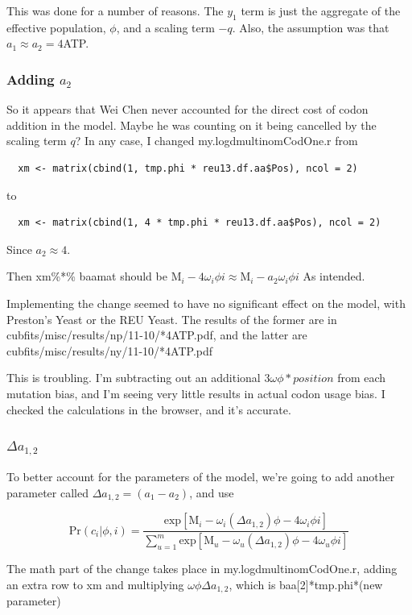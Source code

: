 This was done for a number of reasons. The $y_1$ term is just the aggregate of the effective population, $\phi$, and a scaling term $-q$. Also, the assumption was that $a_1 \approx a_2 = 4$ATP.

\subsubsection{Adding $a_2$}

So it appears that Wei Chen never accounted for the direct cost of codon addition in the model. Maybe he was counting on it being cancelled by the scaling term $q$? In any case, I changed my.logdmultinomCodOne.r from
\begin{verbatim}
  xm <- matrix(cbind(1, tmp.phi * reu13.df.aa$Pos), ncol = 2)
\end{verbatim}

to

\begin{verbatim}
  xm <- matrix(cbind(1, 4 * tmp.phi * reu13.df.aa$Pos), ncol = 2)
\end{verbatim}

Since $a_2\approx4$.

Then xm\%*\% baamat should be
$
\mbox{M}_i- 4\omega_i\phi i
\approx
\mbox{M}_i- a_2\omega_i\phi i
$
As intended.


Implementing the change seemed to have no significant effect on the model, with Preston's Yeast or the REU Yeast. The results of the former are in cubfits/misc/results/np/11-10/*4ATP.pdf, and the latter are cubfits/misc/results/ny/11-10/*4ATP.pdf

This is troubling. I'm subtracting out an additional $3\omega\phi * position$ from each mutation bias, and I'm seeing very little results in actual codon usage bias. I checked the calculations in the browser, and it's accurate. 

\subsubsection{$\Delta a_{1,2}$}

To better account for the parameters of the model, we're going to add another parameter called $\Delta a_{1,2} = (a_1 - a_2)$, and use

\[
\mbox{Pr}(c_i|\phi,i)
=
\frac{
\mbox{exp}[\mbox{M}_i
- \omega_i(\Delta a_{1,2})\phi
- 4\omega_i\phi i
]
}{
\sum_{u=1}^m
\mbox{exp}[\mbox{M}_u
- \omega_u(\Delta a_{1,2})\phi
- 4\omega_u\phi i
]
}
\]

The math part of the change takes place in my.logdmultinomCodOne.r, adding an extra row to xm and multiplying $\omega\phi\Delta a_{1,2}$, which is baa[2]*tmp.phi*(new parameter)

